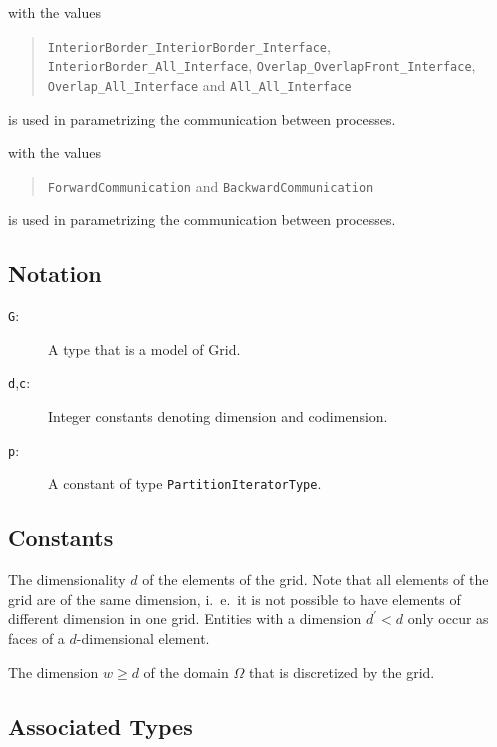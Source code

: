 \documentclass[11pt,a4paper,headinclude,footinclude,DIV14,BCOR8.25mm,titlepage,twoside,openright,normalheadings]{scrreprt}
\begin{document}
with the values
\begin{quote}
\raggedright
\lstinline!InteriorBorder_InteriorBorder_Interface!,
\lstinline!InteriorBorder_All_Interface!,
\lstinline!Overlap_OverlapFront_Interface!,
\lstinline!Overlap_All_Interface! and
\lstinline!All_All_Interface!
\end{quote}
is used in parametrizing the communication between processes.


with the values
\begin{quote}
\raggedright
\lstinline!ForwardCommunication! and
\lstinline!BackwardCommunication!
\end{quote}
is used in parametrizing the communication between processes.

\subsection{Notation}

\begin{description}
\item[{\tt G}:] A type that is a model of Grid.
\item[\texttt{d},\texttt{c}:] Integer constants denoting
  dimension and codimension.
\item[\texttt{p}:] A constant of type \lstinline!PartitionIteratorType!.
\end{description}

\subsection{Constants}


The dimensionality $d$ of the elements of the grid. Note that all elements
of the grid are of the same dimension, i.~e.~it is not possible to
have elements of different dimension in one grid. Entities with a
dimension $d^\prime<d$ only occur as faces of a $d$-dimensional element.

The dimension $w\geq d$ of the domain $\Omega$ that is discretized by the grid.

\subsection{Associated Types}
\end{document}
